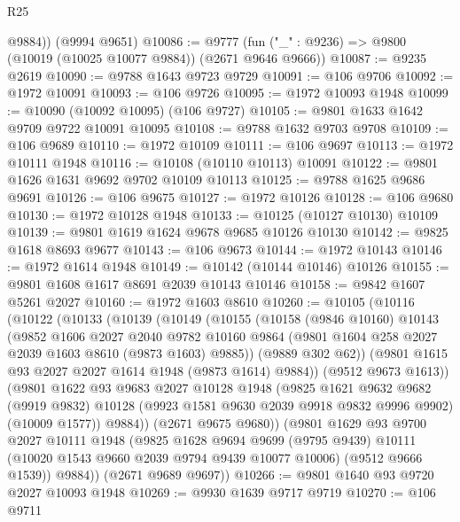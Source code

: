 \begin{lexlean}{R25}
\begin{coremodule}
        @9884))
    (@9994 @9651)
@10086 := @9777 (fun ("_" : @9236) => @9800 (@10019 (@10025 @10077 @9884)) (@2671 @9646 @9666))
@10087 := @9235 @2619
@10090 := @9788 @1643 @9723 @9729
@10091 := @106 @9706
@10092 := @1972 @10091
@10093 := @106 @9726
@10095 := @1972 @10093 @1948
@10099 := @10090 (@10092 @10095) (@106 @9727)
@10105 := @9801 @1633 @1642 @9709 @9722 @10091 @10095
@10108 := @9788 @1632 @9703 @9708
@10109 := @106 @9689
@10110 := @1972 @10109
@10111 := @106 @9697
@10113 := @1972 @10111 @1948
@10116 := @10108 (@10110 @10113) @10091
@10122 := @9801 @1626 @1631 @9692 @9702 @10109 @10113
@10125 := @9788 @1625 @9686 @9691
@10126 := @106 @9675
@10127 := @1972 @10126
@10128 := @106 @9680
@10130 := @1972 @10128 @1948
@10133 := @10125 (@10127 @10130) @10109
@10139 := @9801 @1619 @1624 @9678 @9685 @10126 @10130
@10142 := @9825 @1618 @8693 @9677
@10143 := @106 @9673
@10144 := @1972 @10143
@10146 := @1972 @1614 @1948
@10149 := @10142 (@10144 @10146) @10126
@10155 := @9801 @1608 @1617 @8691 @2039 @10143 @10146
@10158 := @9842 @1607 @5261 @2027
@10160 := @1972 @1603 @8610
@10260 := @10105
    (@10116
      (@10122
        (@10133
          (@10139
            (@10149
              (@10155
                (@10158
                  (@9846 @10160)
                  @10143
                  (@9852
                    @1606
                    @2027
                    @2040
                    @9782
                    @10160
                    @9864
                    (@9801 @1604 @258 @2027 @2039 @1603 @8610 (@9873 @1603) @9885))
                  (@9889 @302 @62))
                (@9801 @1615 @93 @2027 @2027 @1614 @1948 (@9873 @1614) @9884))
              (@9512 @9673 @1613))
            (@9801
              @1622
              @93
              @9683
              @2027
              @10128
              @1948
              (@9825
                @1621
                @9632
                @9682
                (@9919 @9832)
                @10128
                (@9923 @1581 @9630 @2039 @9918 @9832 @9996 @9902)
                (@10009 @1577))
              @9884))
          (@2671 @9675 @9680))
        (@9801
          @1629
          @93
          @9700
          @2027
          @10111
          @1948
          (@9825
            @1628
            @9694
            @9699
            (@9795 @9439)
            @10111
            (@10020 @1543 @9660 @2039 @9794 @9439 @10077 @10006)
            (@9512 @9666 @1539))
          @9884))
      (@2671 @9689 @9697))
@10266 := @9801 @1640 @93 @9720 @2027 @10093 @1948
@10269 := @9930 @1639 @9717 @9719
@10270 := @106 @9711

\end{coremodule}
\end{lexlean}
